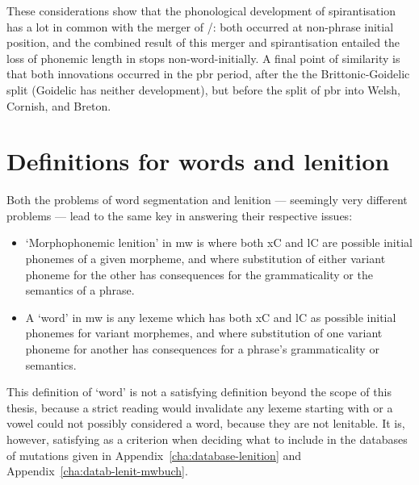 These considerations show that the phonological development of spirantisation has a lot in common with the merger of \xD/\lT: both occurred at non-phrase initial position, and the combined result of this merger and spirantisation entailed the loss of phonemic length in stops non-word-initially.
A final point of similarity is that both innovations occurred in the \gls{pbr} period, after the the Brittonic-Goidelic split (Goidelic has neither development), but before the split of \gls{pbr} into Welsh, Cornish, and Breton.

\section{Definitions for words and lenition}

Both the problems of word segmentation and lenition --- seemingly very different problems --- lead to the same key in answering their respective issues: 
\begin{itemize}
    \item `Morphophonemic lenition' in \gls{mw} is where both \gls{x}\gls{C}  and \gls{l}\gls{C} are possible initial phonemes of a given morpheme, and where  substitution of either variant phoneme for the other has consequences for the grammaticality or the semantics of a phrase.
    \item A `word' in \gls{mw} is any lexeme which has both \gls{x}\gls{C} and \gls{l}\gls{C} as possible initial phonemes for variant morphemes, and where  substitution of one variant phoneme for another has consequences for a phrase's grammaticality or semantics.
\end{itemize}
This definition of `word' is not a satisfying definition beyond the scope of this thesis, because a strict reading would invalidate any lexeme starting with  or a vowel could not possibly considered a word, because they are not lenitable. It is, however, satisfying as a criterion when deciding what to include in the databases of mutations given in Appendix~\ref{cha:database-lenition} and Appendix~\ref{cha:datab-lenit-mwbuch}.


